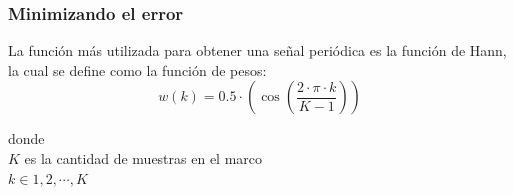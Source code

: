 \documentclass[
10pt, %
aspectratio=169, %
]{beamer}
\begin{document}
	\begin{frame}
		
		\frametitle{Minimizando el error}
				
		La función más utilizada para obtener una señal periódica es la función de Hann, la cual se define como la función de pesos: 
		$$w(k) = 0.5 \cdot (\cos(\frac{2 \cdot \pi \cdot k}{K - 1}))$$
		
		donde \\
		\hspace{.5cm} $K$ es la cantidad de muestras en el marco \\
		\hspace{.5cm} $k \in 1, 2, \cdots, K$
		
	\end{frame}
	
\end{document}

